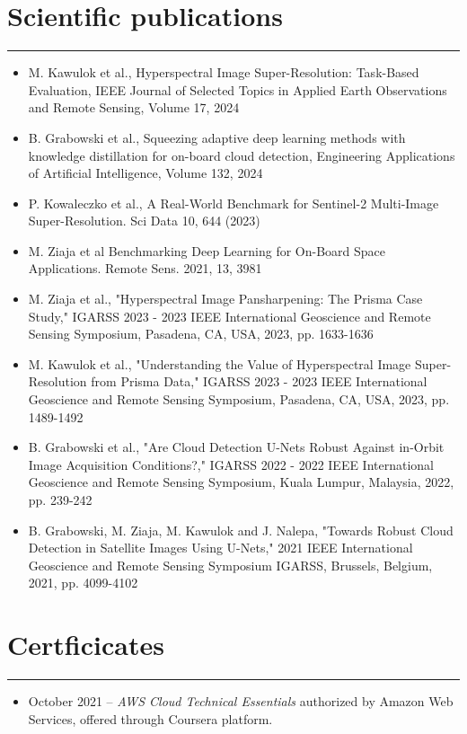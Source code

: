\documentclass{article}
\begin{document}
\section*{Scientific publications}
\hrule \medskip
\begin{itemize}
	\item M. Kawulok et al., Hyperspectral Image Super-Resolution: Task-Based
		Evaluation, IEEE Journal of Selected Topics in Applied Earth
		Observations and Remote Sensing, Volume 17, 2024
	\item B. Grabowski et al., Squeezing adaptive deep learning methods with
		knowledge distillation for on-board cloud detection, Engineering
		Applications of Artificial Intelligence, Volume 132, 2024
	\item P. Kowaleczko et al., A Real-World Benchmark for Sentinel-2
		Multi-Image Super-Resolution. Sci Data 10, 644 (2023)
	\item M. Ziaja et al Benchmarking Deep Learning for On-Board Space
		Applications. Remote Sens. 2021, 13, 3981
	\item M. Ziaja et al., "Hyperspectral Image Pansharpening: The Prisma Case
		Study," IGARSS 2023 - 2023 IEEE International Geoscience and Remote
		Sensing Symposium, Pasadena, CA, USA, 2023, pp. 1633-1636
	\item M. Kawulok et al., "Understanding the Value of Hyperspectral Image
		Super-Resolution from Prisma Data," IGARSS 2023 - 2023 IEEE
		International Geoscience and Remote Sensing Symposium, Pasadena, CA,
		USA, 2023, pp. 1489-1492
	\item B. Grabowski et al., "Are Cloud Detection U-Nets Robust Against
		in-Orbit Image Acquisition Conditions?," IGARSS 2022 - 2022 IEEE
		International Geoscience and Remote Sensing Symposium, Kuala Lumpur,
		Malaysia, 2022, pp. 239-242
	\item B. Grabowski, M. Ziaja, M. Kawulok and J. Nalepa, "Towards Robust
		Cloud Detection in Satellite Images Using U-Nets," 2021 IEEE
		International Geoscience and Remote Sensing Symposium IGARSS, Brussels,
		Belgium, 2021, pp. 4099-4102
\end{itemize}

\section*{Certficicates}
\hrule \medskip
\begin{itemize}
	\item October 2021 -- \textit{AWS Cloud Technical Essentials} authorized by Amazon Web
	Services, offered through Coursera platform.
\end{itemize}
\end{document}

